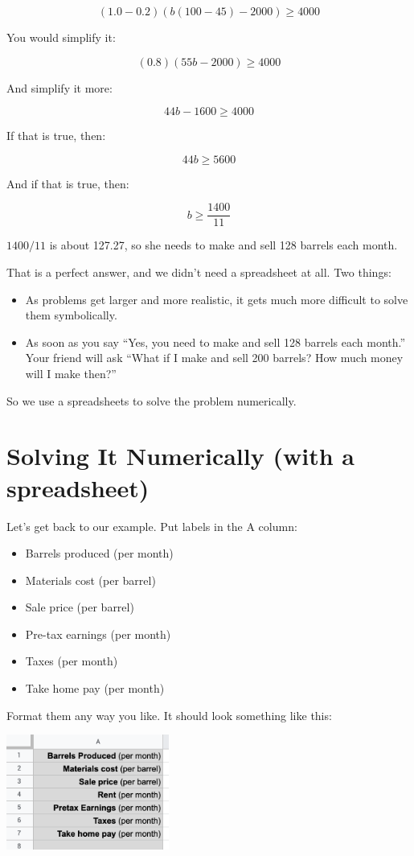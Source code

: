 $$(1.0 - 0.2)\left(b(100 - 45) - 2000\right) \geq 4000$$

You would simplify it:

$$(0.8)\left(55 b - 2000\right) \geq 4000$$

And simplify it more:

$$44b - 1600 \geq 4000$$

If that is true, then:

$$44b \geq 5600$$

And if that is true, then:

$$b \geq \frac{1400}{11}$$

$1400/11$ is about 127.27, so she needs to make and sell 128 barrels
each month.

That is a perfect answer, and we didn't need a spreadsheet at all. Two things:
\begin{itemize}
\item As problems get larger and more realistic, it gets much more difficult to solve them symbolically.
\item As soon as you say ``Yes, you need to make and sell 128 barrels
  each month.'' Your friend will ask ``What if I make and sell 200
  barrels? How much money will I make then?''
\end{itemize}

So we use a spreadsheets to solve the problem numerically.

\section{Solving It Numerically (with a spreadsheet)}


Let's get back to our example. Put labels in the A column:
\begin{itemize}
\item{Barrels produced (per month)}
\item{Materials cost (per barrel)}
\item{Sale price (per barrel)}
\item{Pre-tax earnings (per month)}
\item{Taxes (per month)}
\item{Take home pay (per month)}
\end{itemize}

Format them any way you like. It should look something like this:

\includegraphics[width=0.4\textwidth]{BarrelLabels.png}

